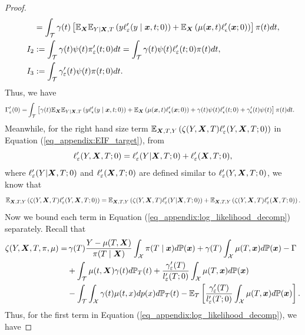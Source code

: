 \begin{proof}
\begin{align*}
 & =\int_{\mathcal{T}}\gamma(t)\left[\mathbb{E}_{\boldsymbol{X}}\mathbb{E}_{Y|\boldsymbol{X},T}\left(y\ell'_{\varepsilon}(y\mid\boldsymbol{x},t;0)\right)+\mathbb{E}_{\boldsymbol{X}}\left(\mu(\boldsymbol{x},t)\ell'_{\epsilon}(\boldsymbol{x};0)\right)\right]\pi(t)dt,
\\
I_{2} &:=\int_{\mathcal{T}}\gamma(t)\psi(t)\pi'_{\varepsilon}(t;0)dt
 =\int_{\mathcal{T}}\gamma(t)\psi(t)\ell'_{\varepsilon}(t;0)\pi(t)dt,
\\
I_3&:=\int_{\mathcal{T}}\gamma'_{\varepsilon}(t)\psi(t)\pi(t;0)dt.
\end{align*}
Thus, we have
\begin{align}\label{eq_appendix:lemma1_gamma}
\Gamma'_{\varepsilon}(0)  =&\int_{\mathcal{T}}\left[\gamma(t)\mathbb{E}_{\boldsymbol{X}}\mathbb{E}_{Y|\boldsymbol{X},T}\left(y\ell'_{\epsilon}(y\mid\boldsymbol{x},t;0)\right)+\mathbb{E}_{\boldsymbol{X}}\left(\mu(\boldsymbol{x},t)\ell'_{\epsilon}(\boldsymbol{x};0)\right)+\gamma(t)\psi(t)\ell'_{\epsilon}(t;0)+\gamma'_{\epsilon}(t)\psi(t)\right]\pi(t)dt.
\end{align}
Meanwhile, for the right hand size term $\mathbb{E}_{\boldsymbol{X},T,Y}\left(\zeta(Y,\boldsymbol{X},T)\ell'_{\varepsilon}(Y,\boldsymbol{X},T;0)\right)$ in Equation (\ref{eq_appendix:EIF_target}),
from 
$$\ell'_{\varepsilon}(Y,\boldsymbol{X},T;0)=\ell'_{\varepsilon}(Y|\boldsymbol{X},T;0)+\ell'_{\varepsilon}(\boldsymbol{X},T;0),$$
where $\ell'_{\varepsilon}(Y|\boldsymbol{X},T;0)$ and $\ell'_{\varepsilon}(\boldsymbol{X},T;0)$ are defined similar to $\ell'_{\varepsilon}(Y,\boldsymbol{X},T;0)$, we know that
\begin{equation}\label{eq_appendix:log_likelihood_decomp}
\mathbb{E}_{\boldsymbol{X},T,Y}\left(\zeta(Y,\boldsymbol{X},T)\ell'_{\varepsilon}(Y,\boldsymbol{X},T;0)\right)=\mathbb{E}_{\boldsymbol{X},T,Y}\left(\zeta(Y,\boldsymbol{X},T)\ell'_{\varepsilon}(Y|\boldsymbol{X},T;0)\right)+\mathbb{E}_{\boldsymbol{X},T,Y}\left(\zeta(Y,\boldsymbol{X},T)\ell'_{\varepsilon}(\boldsymbol{X},T;0)\right).    
\end{equation}
Now we bound each term in Equation (\ref{eq_appendix:log_likelihood_decomp}) separately.
Recall that
\begin{equation*} 
\begin{split}
    \zeta(Y,\boldsymbol{X},T,\pi,\mu)
    =&\,\gamma(T)\frac{Y-\mu(T,\boldsymbol{X})}{\pi(T\mid\boldsymbol{X})}\int_{\mathcal{X}}\pi(T\mid\boldsymbol{x})d\mathbb{P}(\boldsymbol{x})+\gamma(T)\int_{\mathcal{X}}\mu(T,\boldsymbol{x})d\mathbb{P}(\boldsymbol{x})-\Gamma
    \\&+\int_{\mathcal{\mathcal{T}}}\mu(t,\boldsymbol{X})\text{\ensuremath{\gamma(t)}}d\mathbb{P}_T(t)+\frac{\gamma'_{\varepsilon}(T)}{l'_{\varepsilon}(T;0)}\int_{\mathcal{X}}\mu(T,\boldsymbol{x})d\mathbb{P}(\boldsymbol{x})
    \\&-\int_{\mathcal{T}}\int_{\mathcal{X}}\gamma(t)\mu(t,x)dp(x)d\mathbb{P}_T(t)-\mathbb{E}_T\left[\frac{\gamma'_{\varepsilon}(T)}{l'_{\varepsilon}(T;0)}\int_{\mathcal{X}}\mu(T,\boldsymbol{x})d\mathbb{P}(\boldsymbol{x})\right].
\end{split}
\end{equation*}
Thus, for the first term in Equation (\ref{eq_appendix:log_likelihood_decomp}), we have

\end{proof}
